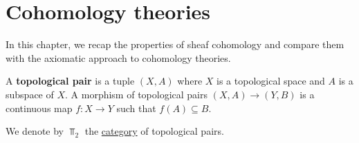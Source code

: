 \documentclass[../../main]{subfiles}
\begin{document}
\chapter{Cohomology theories}

In this chapter, we recap the properties of sheaf cohomology and compare them with the axiomatic approach to cohomology theories.

\begin{definition}\label{def:topological-pair}
  A \textbf{topological pair} is a tuple \((X, A)\) where \(X\) is a topological space and \(A\) is a subspace of \(X\).
  A morphism of topological pairs \((X, A) \to (Y, B)\) is a continuous map \(f\colon X \to Y\) such that \(f(A) \subseteq B\).
  
  We denote by \(\Top_{2}\) the \hyperref[def:category]{category} of topological pairs.
\end{definition}
\end{document}
